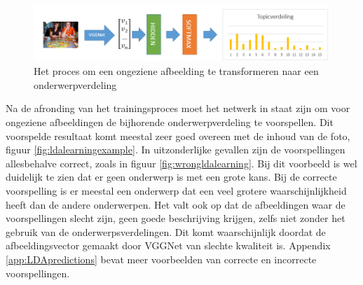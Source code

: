 \begin{figure}[tb]
    \centering
    \includegraphics[width=\linewidth]{Images/LDANetwerk.PNG}
    \caption{Het proces om een ongeziene afbeelding te transformeren naar een onderwerpverdeling}
    \label{fig:learningLDA}
\end{figure}

Na de afronding van het trainingsproces moet het netwerk in staat zijn om voor ongeziene afbeeldingen de bijhorende onderwerpverdeling te voorspellen. Dit voorspelde resultaat komt meestal zeer goed overeen met de inhoud van de foto, figuur \ref{fig:ldalearningexample}. In uitzonderlijke gevallen zijn de voorspellingen allesbehalve correct, zoals in figuur \ref{fig:wrongldalearning}. Bij dit voorbeeld is wel duidelijk te zien dat er geen onderwerp is met een grote kans. Bij de correcte voorspelling is er meestal een onderwerp dat een veel grotere waarschijnlijkheid heeft dan de andere onderwerpen. Het valt ook op dat de afbeeldingen waar de voorspellingen slecht zijn, geen goede beschrijving krijgen, zelfs niet zonder het gebruik van de onderwerpsverdelingen. Dit komt waarschijnlijk doordat de afbeeldingsvector gemaakt door VGGNet van slechte kwaliteit is. Appendix \ref{app:LDApredictions} bevat meer voorbeelden van correcte en incorrecte voorspellingen.

